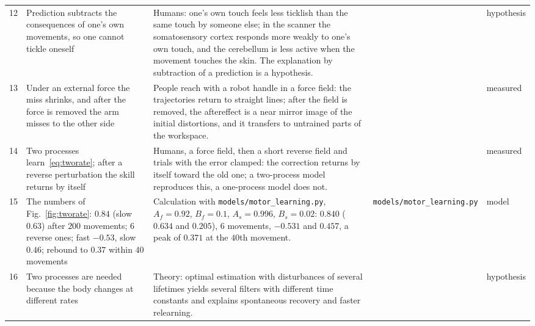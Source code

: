 {\begin{longtable}{>{\raggedright}p{0.5cm}>{\raggedright}p{4.0cm}>{\raggedright}p{5.6cm}>{\raggedright}p{2.3cm}>{\raggedright\arraybackslash}p{1.7cm}}
12 & Prediction subtracts the consequences of one's own movements, so one cannot tickle oneself & Humans: one's own touch feels less ticklish than the same touch by someone else; in the scanner the somatosensory cortex responds more weakly to one's own touch, and the cerebellum is less active when the movement touches the skin. The explanation by subtraction of a prediction is a hypothesis. & \cite{Blakemore1998} & hypothesis \\
13 & Under an external force the miss shrinks, and after the force is removed the arm misses to the other side & People reach with a robot handle in a force field: the trajectories return to straight lines; after the field is removed, the aftereffect is a near mirror image of the initial distortions, and it transfers to untrained parts of the workspace. & \cite{ShadmehrMussaIvaldi1994} & measured \\
14 & Two processes learn~\eqref{eq:tworate}; after a reverse perturbation the skill returns by itself & Humans, a force field, then a short reverse field and trials with the error clamped: the correction returns by itself toward the old one; a two-process model reproduces this, a one-process model does not. & \cite{Smith2006} & measured \\
15 & The numbers of Fig.~\ref{fig:tworate}: $0.84$ (slow $0.63$) after $200$ movements; $6$ reverse ones; fast $-0.53$, slow $0.46$; rebound to $0.37$ within $40$ movements & Calculation with \texttt{models/\allowbreak motor\_\allowbreak learning.py}, $A_f=0.92$, $B_f=0.1$, $A_s=0.996$, $B_s=0.02$: $0.840$ ($0.634$ and $0.205$), $6$ movements, $-0.531$ and $0.457$, a peak of $0.371$ at the $40$th movement. & \texttt{models/\allowbreak motor\_\allowbreak learning.py} & model \\
16 & Two processes are needed because the body changes at different rates & Theory: optimal estimation with disturbances of several lifetimes yields several filters with different time constants and explains spontaneous recovery and faster relearning. & \cite{Kording2007} & hypothesis \\
\bottomrule
\end{longtable}}

